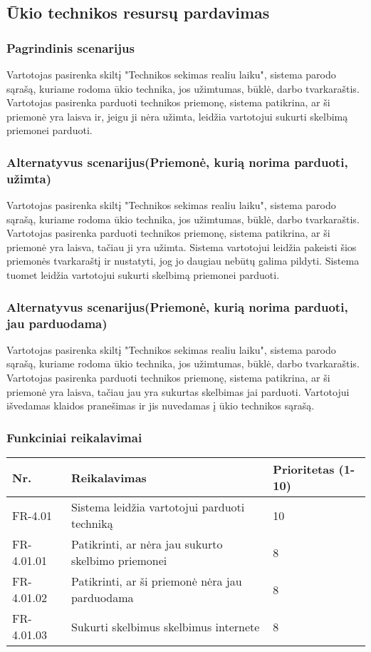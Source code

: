 \documentclass[oneside]{VUMIFPSkursinis}
\begin{document}
\subsection{Ūkio technikos resursų pardavimas}
\subsubsection{Pagrindinis scenarijus}
	Vartotojas pasirenka skiltį "Technikos sekimas realiu laiku", sistema parodo sąrašą, kuriame rodoma ūkio technika, jos užimtumas, būklė, darbo tvarkaraštis. Vartotojas pasirenka parduoti technikos priemonę, sistema patikrina, ar ši priemonė yra laisva ir, jeigu ji nėra užimta, leidžia vartotojui sukurti skelbimą priemonei parduoti.
\subsubsection{Alternatyvus scenarijus(Priemonė, kurią norima parduoti, užimta)}
	Vartotojas pasirenka skiltį "Technikos sekimas realiu laiku", sistema parodo sąrašą, kuriame rodoma ūkio technika, jos užimtumas, būklė, darbo tvarkaraštis. Vartotojas pasirenka parduoti technikos priemonę, sistema patikrina, ar ši priemonė yra laisva, tačiau ji yra užimta. Sistema vartotojui leidžia pakeisti šios priemonės tvarkaraštį ir nustatyti, jog jo daugiau nebūtų galima pildyti. Sistema tuomet leidžia vartotojui sukurti skelbimą priemonei parduoti.
\subsubsection{Alternatyvus scenarijus(Priemonė, kurią norima parduoti, jau parduodama)}
	Vartotojas pasirenka skiltį "Technikos sekimas realiu laiku", sistema parodo sąrašą, kuriame rodoma ūkio technika, jos užimtumas, būklė, darbo tvarkaraštis. Vartotojas pasirenka parduoti technikos priemonę, sistema patikrina, ar ši priemonė yra laisva, tačiau jau yra sukurtas skelbimas jai parduoti. Vartotojui išvedamas klaidos pranešimas ir jis nuvedamas į ūkio technikos sąrašą.
\subsubsection{Funkciniai reikalavimai}
\begin{table}[htbp]
	\begin{tabularx}{1\textwidth}{ |P{2.5cm}|X|P{3cm }| }  \hline
           	Nr. & Reikalavimas &  Prioritetas (1-10)  \\   \hline 
         		FR-4.01 & Sistema leidžia vartotojui parduoti techniką & 10  \\   \hline
		FR-4.01.01 & Patikrinti, ar nėra jau sukurto skelbimo priemonei & 8 \\  \hline
		FR-4.01.02 & Patikrinti, ar ši priemonė nėra jau parduodama & 8 \\ \hline
		FR-4.01.03 & Sukurti skelbimus skelbimus internete & 8 \\ \hline
	\end{tabularx}
\end{table}
\end{document}
